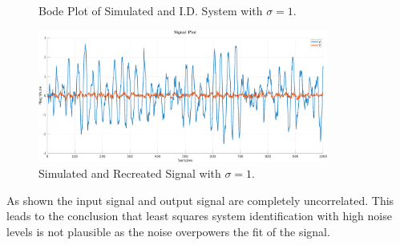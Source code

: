\documentclass[11pt]{article}
\begin{document}
\begin{enumerate}[label=\textbf{\arabic*.}]
\begin{figure}[H]
    \caption{Bode Plot of Simulated and I.D. System with $\sigma=1$.}
  \end{figure}
  \begin{figure}[H]
    \centering
    \includegraphics[width=0.85\textwidth]{4e-1.png}
    \caption{Simulated and Recreated Signal with $\sigma=1$.}
  \end{figure}
  As shown the input signal and output signal are completely uncorrelated. This 
  leads to the conclusion that least squares system identification with high 
  noise levels is not plausible as the noise overpowers the fit of the signal.


\end{enumerate}
\end{document}
